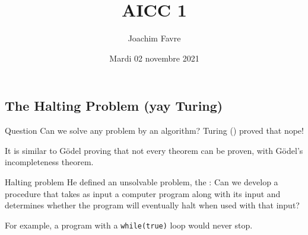 \documentclass[a4paper]{article}
\title{AICC 1}
\author{Joachim Favre}
\date{Mardi 02 novembre 2021}
\begin{document}
\maketitle


\subsection{The Halting Problem (yay Turing)}
\begin{parag}{Question}
    Can we solve any problem by an algorithm? Turing (\smiley) proved that nope!

    It is similar to Gödel proving that not every theorem can be proven, with Gödel's incompleteness theorem.
\end{parag}

\begin{parag}{Halting problem}
    He defined an unsolvable problem, the : Can we develop a procedure that takes as input a computer program along with its input and determines whether the program will eventually halt when used with that input?

    For example, a program with a \texttt{while(true)} loop would never stop.
\end{parag}
\end{document}
